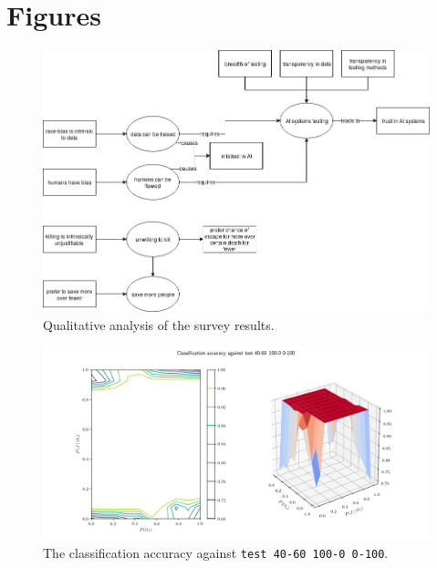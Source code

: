 \documentclass[]{report}
\newcommand{\code}{\texttt}
\begin{document}



\appendix
\chapter{Figures}

\begin{figure}[h]
    \centering
    \includegraphics[scale=0.46]{figures/moral_ai_survey_analysis.jpg}
    \caption[]{Qualitative analysis of the survey results.}
    \label{fig:survey_analysis}
\end{figure}

% 
% 

\begin{figure}[h]
    \centering
    \centerline{\includegraphics[scale=0.55]{test_40-60_100-0_0-100_accuracy.png}}
    \caption[]{The classification accuracy against \code{test 40-60 100-0 0-100}.}
    \label{fig:test_40-60_100-0_0-100_accuracy_plot}
\end{figure}
\end{document}
